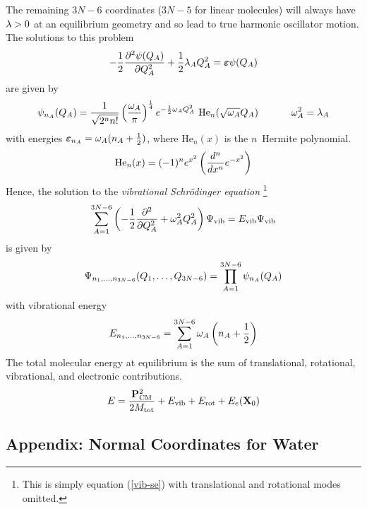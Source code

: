 \documentclass[11pt]{article}
\begin{document}
The remaining $3N-6$ coordinates ($3N-5$ for linear molecules) will always have
$\lambda>0$ at an equilibrium geometry and so lead to true harmonic oscillator
motion. The solutions to this problem
\begin{align}
-\dfrac{1}{2}
     \dfrac{ \partial^{2} \psi(Q_A) }{\partial Q_A ^{2}}
+\dfrac{1}{2}
    \lambda_A
    Q_A^2
=
    \bm\varepsilon
    \psi(Q_A)
\end{align}
are given by
\begin{align}
    \psi_{n_A}(Q_A)
=
\dfrac{1}{\sqrt{2^n n!}}\left(\dfrac{\omega_A}{\pi}\right)^{\frac{1}{4}}
    e^{-\frac{1}{2}\omega_AQ_A^2}
    \ \text{He}_n(\sqrt{\omega_A}Q_A)
\ \ \ \ \ \ \ \ \ \ 
    \omega_A^2=\lambda_A
\end{align}
with energies $\bm\varepsilon_{n_A}=\omega_A(n_A+\frac{1}{2})$, where $\text{He}_n(x)$ is the
$n$\eth\ Hermite polynomial.
\begin{align}
    \text{He}_n(x)
=   (-1)^n
    e^{x^2}
    \left(\dfrac{d^n}{dx^n}e^{-x^2}\right)
\end{align}
Hence, the solution to the {\it vibrational Schr\"odinger equation}
\footnote{This is simply equation (\ref{vib-se}) with translational and
rotational modes omitted.}
\begin{align}
\sum_{A=1}^{3N-6}
    \left(-\dfrac{1}{2} \dfrac{ \partial^{2}  }{\partial Q_A ^{2}}+\omega_A^2Q_A^2\right)
    \Psi_\text{vib}
=
    E_\text{vib}
    \Psi_\text{vib}
\end{align}
is given by
\begin{align}
    \Psi_{n_1,\ldots,n_{3N-6}}(Q_1,\ldots,Q_{3N-6})
    = \prod_{A=1}^{3N-6}
    \psi_{n_A}(Q_A)
\end{align}
with vibrational energy
\begin{align}
    E_{n_1,\ldots,n_{3N-6}}
=
\sum_{A=1}^{3N-6}
    \omega_A
    \left(n_A+\dfrac{1}{2}\right)
\end{align}
The total molecular energy at equilibrium is the sum of translational,
rotational, vibrational, and electronic contributions.
\begin{align}
    E
    = \dfrac{\mathbf{P}_\text{CM}^2}{2M_\text{tot}}
    + E_\text{vib}
    + E_\text{rot}
    + E_e(\mathbf{X}_0)
\end{align}



\newpage
\subsection{Appendix: Normal Coordinates for Water}
\end{document}
